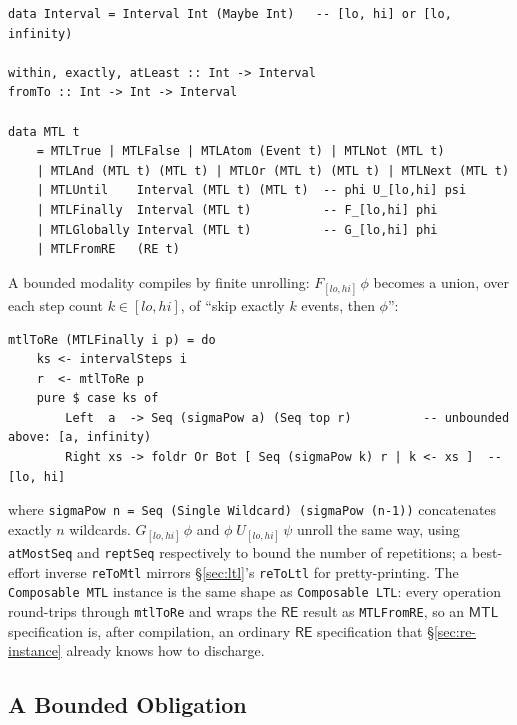 \documentclass[acmsmall,screen]{acmart}
\newcommand{\RE}{\mathsf{RE}}
\newcommand{\MTL}{\mathsf{MTL}}
\begin{document}
\begin{lstlisting}
data Interval = Interval Int (Maybe Int)   -- [lo, hi] or [lo, infinity)

within, exactly, atLeast :: Int -> Interval
fromTo :: Int -> Int -> Interval

data MTL t
    = MTLTrue | MTLFalse | MTLAtom (Event t) | MTLNot (MTL t)
    | MTLAnd (MTL t) (MTL t) | MTLOr (MTL t) (MTL t) | MTLNext (MTL t)
    | MTLUntil    Interval (MTL t) (MTL t)  -- phi U_[lo,hi] psi
    | MTLFinally  Interval (MTL t)          -- F_[lo,hi] phi
    | MTLGlobally Interval (MTL t)          -- G_[lo,hi] phi
    | MTLFromRE   (RE t)
\end{lstlisting}
A bounded modality compiles by finite unrolling: $F_{[lo,hi]}\,\phi$ becomes
a union, over each step count $k \in [lo, hi]$, of ``skip exactly $k$
events, then $\phi$'':
\begin{lstlisting}
mtlToRe (MTLFinally i p) = do
    ks <- intervalSteps i
    r  <- mtlToRe p
    pure $ case ks of
        Left  a  -> Seq (sigmaPow a) (Seq top r)          -- unbounded above: [a, infinity)
        Right xs -> foldr Or Bot [ Seq (sigmaPow k) r | k <- xs ]  -- [lo, hi]
\end{lstlisting}
where \lstinline{sigmaPow n = Seq (Single Wildcard) (sigmaPow (n-1))}
concatenates exactly $n$ wildcards.
$G_{[lo,hi]}\,\phi$ and $\phi\;U_{[lo,hi]}\,\psi$ unroll the same way,
using \lstinline{atMostSeq} and \lstinline{reptSeq} respectively to bound
the number of repetitions; a best-effort inverse \lstinline{reToMtl}
mirrors \S\ref{sec:ltl}'s \lstinline{reToLtl} for pretty-printing.
The \lstinline{Composable MTL} instance is the same shape as
\lstinline{Composable LTL}: every operation round-trips through
\lstinline{mtlToRe} and wraps the $\RE$ result as \lstinline{MTLFromRE}, so
an $\MTL$ specification is, after compilation, an ordinary $\RE$
specification that \S\ref{sec:re-instance} already knows how to discharge.

\subsection{A Bounded Obligation}
\end{document}
